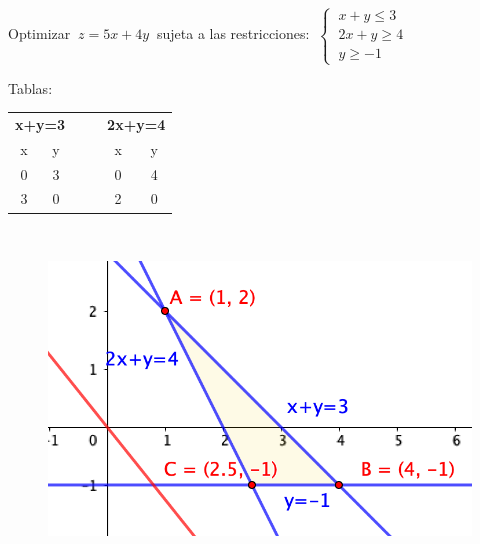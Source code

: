 \begin{ejemplo}
\begin{ejer}
	Optimizar $\ z=5x+4y\ $ sujeta a las restricciones: $\ \begin{cases} \ x+y\le 3 \\ \ 2x+y\ge 4 \\ \ y\ge -1 \end{cases}$	
\end{ejer}	
\end{ejemplo}
\vspace{5mm}
\begin{multicols}{2}
	
	Tablas: 
	
	\begin{table}[H]
	\centering	
	\begin{tabular}{ccccc}
	\multicolumn{2}{c}{\textbf{x+y=3}} & $\quad$ & \multicolumn{2}{c}{\textbf{2x+y=4}} \\
	\multicolumn{1}{c|}{x}     & y     &         & \multicolumn{1}{c|}{x}      & y     \\ \cline{1-2} \cline{4-5} 
	\multicolumn{1}{c|}{0}     & 3     &         & \multicolumn{1}{c|}{0}      & 4     \\
	\multicolumn{1}{c|}{3}     & 0     &         & \multicolumn{1}{c|}{2}      & 0    
	\end{tabular}
	\end{table}
	
	$\quad$

	\begin{figure}[H]
	\centering
	\includegraphics[width=.5\textwidth]{imagenes/img28.png}
\end{figure}
\end{multicols}

